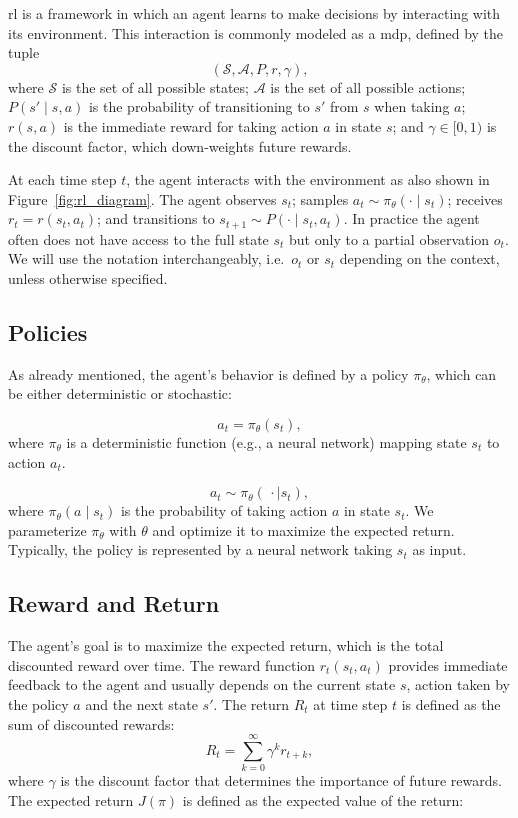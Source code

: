 \gls{rl} is a framework in which an agent learns to make decisions by interacting with its environment.  This interaction is commonly modeled as a \gls{mdp}, defined by the tuple
\[
(\mathcal{S}, \mathcal{A}, P, r, \gamma),
\]
where \(\mathcal{S}\) is the set of all possible states; \(\mathcal{A}\) is the set of all possible actions; \(P(s'\!\mid\!s,a)\) is the probability of transitioning to \(s'\) from \(s\) when taking \(a\); \(r(s,a)\) is the immediate reward for taking action \(a\) in state \(s\); and \(\gamma\in[0,1)\) is the discount factor, which down-weights future rewards.

At each time step \(t\), the agent interacts with the environment as also shown in Figure~\ref{fig:rl_diagram}. The agent observes \(s_t\); samples \(a_t\sim\pi_\theta(\cdot\mid s_t)\); receives \(r_t = r(s_t,a_t)\); and transitions to \(s_{t+1}\sim P(\cdot\mid s_t,a_t)\). In practice the agent often does not have access to the full state \(s_t\) but only to a partial observation \(o_t\).  We will use the notation interchangeably, i.e.\ \(o_t\) or \(s_t\) depending on the context, unless otherwise specified.
\subsection{Policies}
As already mentioned, the agent's behavior is defined by a policy \(\pi_\theta\), which can be either deterministic or stochastic:
 
    \[
      a_t = \pi_{\theta}(s_t),
    \]
    where \(\pi_{\theta}\) is a deterministic function (e.g., a neural network) mapping state \(s_t\) to action \(a_t\).

    \[
      a_t \sim \pi_{\theta}(\,\cdot\mid s_t),
    \]
    where \(\pi_{\theta}(a\mid s_t)\) is the probability of taking action \(a\) in state \(s_t\).
We parameterize \(\pi_{\theta}\) with \(\theta\) and optimize it to maximize the expected return. Typically, the policy is represented by a neural network taking \(s_t\) as input.

\subsection{Reward and Return}
The agent's goal is to maximize the expected return, which is the total discounted reward over time. 
The reward function \(r_t(s_t,a_t)\) provides immediate feedback to the agent and usually depends on the current state \(s\), action taken by the policy \(a\) and the next state \(s'\). The return \(R_t\) at time step \(t\) is defined as the sum of discounted rewards:
\[
R_t = \sum_{k=0}^{\infty} \gamma^k r_{t+k},
\]
where \(\gamma\) is the discount factor that determines the importance of future rewards. The expected return \(J(\pi)\) is defined as the expected value of the return:

